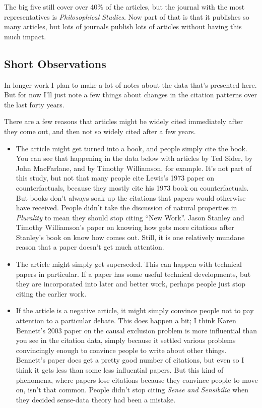 \documentclass[
  10pt,
  letterpaper,
  DIV=11,
  numbers=noendperiod,
  twoside]{scrartcl}
\providecommand{\tightlist}{%
  \setlength{\itemsep}{0pt}\setlength{\parskip}{0pt}}\usepackage{longtable,booktabs,array}
\begin{document}
The big five still cover over 40\% of the articles, but the journal with
the most representatives is \emph{Philosophical Studies}. Now part of
that is that it publishes so many articles, but lots of journals publish
lots of articles without having this much impact.

\subsection{Short Observations}\label{short-observations}

In longer work I plan to make a lot of notes about the data that's
presented here. But for now I'll just note a few things about changes in
the citation patterns over the last forty years.

There are a few reasons that articles might be widely cited immediately
after they come out, and then not so widely cited after a few years.

\begin{itemize}
\tightlist
\item
  The article might get turned into a book, and people simply cite the
  book. You can see that happening in the data below with articles by
  Ted Sider, by John MacFarlane, and by Timothy Williamson, for example.
  It's not part of this study, but not that many people cite Lewis's
  1973 paper on counterfactuals, because they mostly cite his 1973 book
  on counterfactuals. But books don't always soak up the citations that
  papers would otherwise have received. People didn't take the
  discussion of natural properties in \emph{Plurality} to mean they
  should stop citing ``New Work''. Jason Stanley and Timothy
  Williamson's paper on knowing how gets more citations after Stanley's
  book on know how comes out. Still, it is one relatively mundane reason
  that a paper doesn't get much attention.
\item
  The article might simply get superseded. This can happen with
  technical papers in particular. If a paper has some useful technical
  developments, but they are incorporated into later and better work,
  perhaps people just stop citing the earlier work.
\item
  If the article is a negative article, it might simply convince people
  not to pay attention to a particular debate. This does happen a bit; I
  think Karen Bennett's 2003 paper on the causal exclusion problem is
  more influential than you see in the citation data, simply because it
  settled various problems convincingly enough to convince people to
  write about other things. Bennett's paper does get a pretty good
  number of citations, but even so I think it gets less than some less
  influential papers. But this kind of phenomena, where papers lose
  citations because they convince people to move on, isn't that common.
  People didn't stop citing \emph{Sense and Sensibilia} when they
  decided sense-data theory had been a mistake.
\end{itemize}
\end{document}
